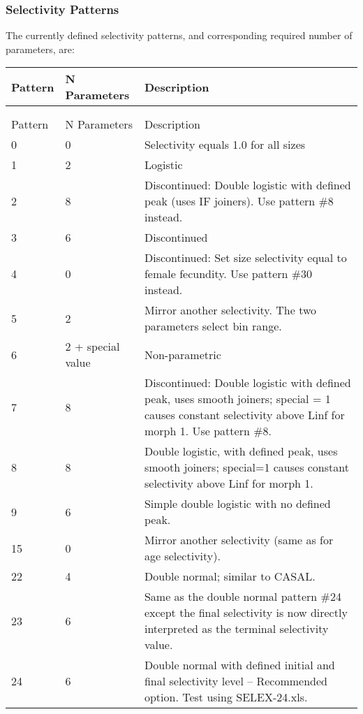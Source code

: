 \subsubsection{Selectivity Patterns}
The currently defined selectivity patterns, and corresponding required number of parameters, are:

\begin{center}
	\begin{longtable}{p{2cm} p{3cm} p{10cm}}
		\endfirsthead

		\hline
		Pattern & N Parameters & Description \\
		\hline
		\endhead

		\endfoot
		\endlastfoot

		\hline
		\multicolumn{3}{c}{SIZE SELECTIVITY}\\
		  &   &  \\
		Pattern & N Parameters & Description \\
		\hline
		0 & 0 & Selectivity equals 1.0 for all sizes \\
		1 & 2 & Logistic \\
		2 & 8 & Discontinued: Double logistic with defined peak (uses IF joiners). Use pattern \#8 instead.\\
		3 & 6 & Discontinued \\
		4 & 0 & Discontinued: Set size selectivity equal to female fecundity. Use pattern \#30 instead.\\
		5 & 2 & Mirror another selectivity. The two parameters select bin range.\\
		6 & 2 + special value & Non-parametric \\
		7 & 8 & Discontinued: Double logistic with defined peak, uses smooth joiners; special = 1 causes constant selectivity above Linf for morph 1.  Use pattern \#8.\\
		8 & 8 & Double logistic, with defined peak, uses smooth joiners; special=1 causes constant selectivity above Linf for morph 1.  \\
		9 & 6 & Simple double logistic with no defined peak.\\
		15 & 0 & Mirror another selectivity (same as for age selectivity).\\
		22 & 4 & Double normal; similar to CASAL.\\
		23 & 6 & Same as the double normal pattern \#24 except the final selectivity is now directly interpreted as the terminal selectivity value.\\
		24 & 6 & Double normal with defined initial and final selectivity level – Recommended option.  Test using SELEX-24.xls. \\

\end{longtable}
\end{center}
